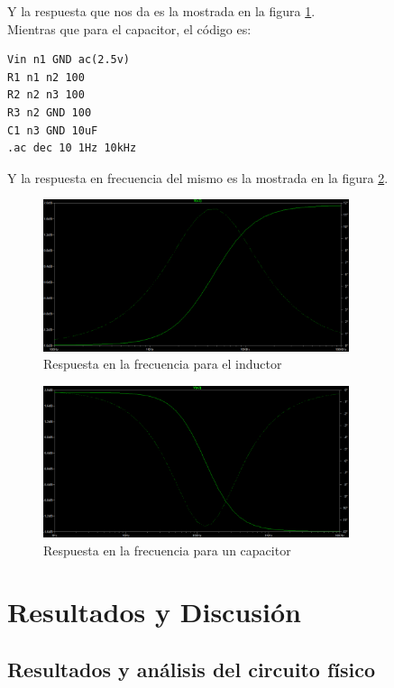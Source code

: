 \documentclass[letterpaper,spanish,12pt]{report}
\begin{document}
Y la respuesta que nos da es la mostrada en la figura \ref{cir:10}. \\ Mientras que para el capacitor, el c\'odigo es:

\begin{verbatim}
Vin n1 GND ac(2.5v)
R1 n1 n2 100
R2 n2 n3 100
R3 n2 GND 100
C1 n3 GND 10uF
.ac dec 10 1Hz 10kHz
\end{verbatim}

Y la respuesta en frecuencia del mismo es la mostrada en la figura \ref{cir:11}.

\begin{figure}[h]
	\centering
		\includegraphics[width=0.80\textwidth]{ResFreL.eps}
	\caption{Respuesta en la frecuencia para el inductor}
	\label{cir:10}
\end{figure}

\begin{figure}[h]
	\centering
		\includegraphics[width=0.80\textwidth]{ResFreC.eps}
	\caption{Respuesta en la frecuencia para un capacitor}
	\label{cir:11}
\end{figure}

	\chapter{Resultados y Discusi\'on}
	\section{Resultados y an\'alisis del circuito f\'isico}
\end{document}
